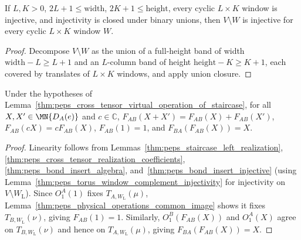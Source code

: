 \begin{lemma}%
    \label{thm:peps_torus_window_complement_injectivity}
    \leanok
    If $L,K>0$, $2L+1\leq\mathrm{width}$, $2K+1\leq\mathrm{height}$, every
    cyclic $L\times K$ window is injective, and injectivity is closed under
    binary unions, then $V\setminus W$ is injective for every cyclic $L\times K$
    window $W$.
\end{lemma}
\begin{proof}
    \leanok
    Decompose $V\setminus W$ as the union of a full-height band of width
    $\mathrm{width}-L\geq L+1$ and an $L$-column band of height
    $\mathrm{height}-K\geq K+1$, each covered by translates of $L\times K$
    windows, and apply union closure.
\end{proof}

\begin{lemma}%
    \label{thm:peps_cross_tensor_algebra_laws}
    \leanok
    Under the hypotheses of
    Lemma~\ref{thm:peps_cross_tensor_virtual_operation_of_staircase}, for all
    $X,X'\in\MN{D_A(e)}$ and $c\in\mathbb C$,
    $F_{AB}(X+X')=F_{AB}(X)+F_{AB}(X')$, $F_{AB}(cX)=cF_{AB}(X)$,
    $F_{AB}(1)=1$, and $F_{BA}(F_{AB}(X))=X$.
\end{lemma}
\begin{proof}
    \leanok
    Linearity follows from Lemmas~\ref{thm:peps_staircase_left_realization},
    \ref{thm:peps_cross_tensor_realization_coefficients},
    \ref{thm:peps_bond_insert_algebra}, and~\ref{thm:peps_bond_insert_injective}
    (using Lemma~\ref{thm:peps_torus_window_complement_injectivity} for
    injectivity on $V\setminus W_{\mathrm L}$). Since $O_1^A(1)$ fixes
    $T_{A,W_{\mathrm L}}(\mu)$, Lemma~\ref{thm:peps_physical_operations_common_image}
    shows it fixes $T_{B,W_{\mathrm L}}(\nu)$, giving $F_{AB}(1)=1$. Similarly,
    $O_1^B(F_{AB}(X))$ and $O_1^A(X)$ agree on $T_{B,W_{\mathrm L}}(\nu)$ and
    hence on $T_{A,W_{\mathrm L}}(\mu)$, giving $F_{BA}(F_{AB}(X))=X$.
\end{proof}

